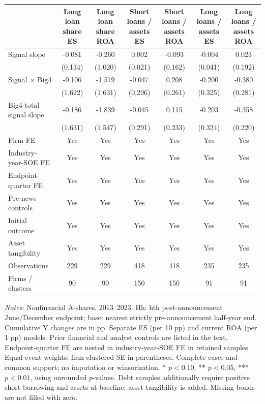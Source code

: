 \documentclass[10pt]{article}
\begin{document}
\begin{minipage}{24cm}\fontsize{10.5}{13}\selectfont\centering
\setlength{\tabcolsep}{4pt}\renewcommand{\arraystretch}{1.12}
\begin{tabular*}{\textwidth}{@{\extracolsep{\fill}}lcccccc@{}}\toprule
 & \shortstack{Long loan share\\ES} & \shortstack{Long loan share\\ROA} & \shortstack{Short loans / assets\\ES} & \shortstack{Short loans / assets\\ROA} & \shortstack{Long loans / assets\\ES} & \shortstack{Long loans / assets\\ROA} \\
\midrule
Signal slope & -0.081 & -0.260 & 0.002 & -0.093 & -0.004 & 0.023 \\
 & (0.134) & (1.020) & (0.021) & (0.162) & (0.041) & (0.192) \\
Signal $\times$ Big4 & -0.106 & -1.579 & -0.047 & 0.208 & -0.200 & -0.380 \\
 & (1.622) & (1.631) & (0.296) & (0.261) & (0.325) & (0.281) \\
Big4 total signal slope & -0.186 & -1.839 & -0.045 & 0.115 & -0.203 & -0.358 \\
 & (1.631) & (1.547) & (0.291) & (0.233) & (0.324) & (0.220) \\
\addlinespace
Firm FE & Yes & Yes & Yes & Yes & Yes & Yes \\
Industry-year-SOE FE & Yes & Yes & Yes & Yes & Yes & Yes \\
Endpoint-quarter FE & Yes & Yes & Yes & Yes & Yes & Yes \\
Pre-news controls & Yes & Yes & Yes & Yes & Yes & Yes \\
Initial outcome & Yes & Yes & Yes & Yes & Yes & Yes \\
Asset tangibility & Yes & Yes & Yes & Yes & Yes & Yes \\
Observations & 229 & 229 & 418 & 418 & 235 & 235 \\
Firms / clusters & 90 & 90 & 150 & 150 & 91 & 91 \\
\bottomrule\end{tabular*}
\par\medskip\raggedright\fontsize{9}{11}\selectfont
\textit{Notes:} Nonfinancial A-shares, 2013--2023. Hh: hth post-announcement June/December endpoint; base: nearest strictly pre-announcement half-year end. Cumulative Y changes are in pp. Separate ES (per 10 pp) and current ROA (per 1 pp) models. Prior financial and analyst controls are listed in the text. Endpoint-quarter FE are nested in industry-year-SOE FE in retained samples. Equal event weights; firm-clustered SE in parentheses. Complete cases and common support; no imputation or winsorization. * $p<0.10$, ** $p<0.05$, *** $p<0.01$, using unrounded $p$-values. Debt samples additionally require positive short borrowing and assets at baseline; asset tangibility is added. Missing bonds are not filled with zero.
\end{minipage}
\end{document}
